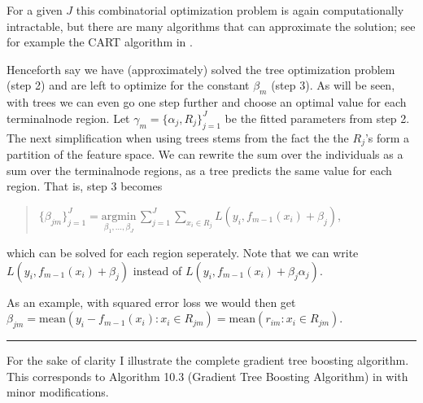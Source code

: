\documentclass[letterpaper,10pt,english]{sphinxmanual}
\begin{document}
For a given \(J\) this combinatorial optimization problem is again computationally intractable, but there are many algorithms that can approximate the solution; see for example the CART algorithm in .

Henceforth say we have (approximately) solved the tree optimization problem (step 2) and are left to optimize for the constant \(\beta_m\) (step 3). As will be seen, with trees we can even go one step further and choose an optimal value for each terminal\sphinxhyphen{}node region. Let \(\gamma_m = \{\alpha_j, R_j\}_{j=1}^J\) be the fitted parameters from step 2. The next simplification when using trees stems from the fact the the \(R_j\)’s form a partition of the feature space. We can rewrite the sum over the individuals as a sum over the terminal\sphinxhyphen{}node regions, as a tree predicts the same value for each region. That is, step 3 becomes
\begin{quote}

\(\{\beta_{jm}\}_{j=1}^J = \underset{\beta_1,\dots,\beta_J}{\text{argmin}} \, \sum_{j=1}^J \sum_{x_i \in R_j} L \left(y_i, f_{m-1}(x_i) + \beta_j \right)\),
\end{quote}

which can be solved for each region seperately. Note that we can write \(L \left(y_i, f_{m-1}(x_i) + \beta_j \right)\) instead of \(L \left(y_i, f_{m-1}(x_i) + \beta_j \alpha_j \right)\).

As an example, with squared error loss we would then get \(\beta_{jm} = \text{mean}(y_i - f_{m-1}(x_i) : x_i \in R_{jm}) = \text{mean}(r_{im} : x_i \in R_{jm})\).


\bigskip\hrule\bigskip



For the sake of clarity I illustrate the complete gradient tree boosting algorithm. This corresponds to Algorithm 10.3 (Gradient Tree Boosting Algorithm) in  with minor modifications.
\end{document}
